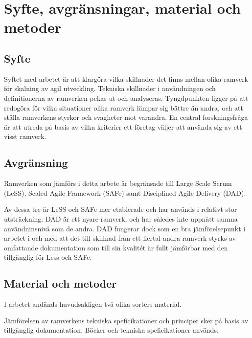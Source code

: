 \section{Syfte, avgränsningar, material och metoder}
	
	
	\subsection{Syfte}
	
		Syftet med arbetet är att klargöra vilka skillnader det finns mellan olika ramverk för skalning av agil utveckling. Tekniska skillnader i användningen och definitionerna av ramverken pekas ut och analyseras.
		Tyngdpunkten ligger på att redogöra för vilka situationer olika ramverk lämpar sig bättre än andra, och att ställa ramverkens styrkor och svagheter mot varandra. \newline
		En central forskningsfråga är att utreda på basis av vilka kriterier ett företag väljer att använda sig av ett visst ramverk.
			
	
	\subsection{Avgränsning}
	
		Ramverken som jämförs i detta arbete är begränsade till Large Scale Scrum (LeSS), Scaled Agile Framework (SAFe) samt Disciplined Agile Delivery (DAD).
		
		Av dessa tre är LeSS och SAFe mer etablerade och har används i relativt stor utsträckning. DAD är ett nyare ramverk, och har således inte uppnått samma användninsnivå som de andra. DAD fungerar dock som en bra jämförelsepunkt i arbetet i och med att det till skillnad från ett flertal andra ramverk styrks av omfattande dokumentation som till sin kvalitét är fullt jämförbar med den tillgänglig för Less och SAFe. \cite{ask_matrix}
		
	
	\subsection{Material och metoder}
		I arbetet andänds huvudsakligen två olika sorters material.
		
		Jämförelsen av ramverkens tekniska speficikationer och principer sker på basis av tillgänglig dokumentation. Böcker och tekniska speficikationer används.
		\linebreak
		
